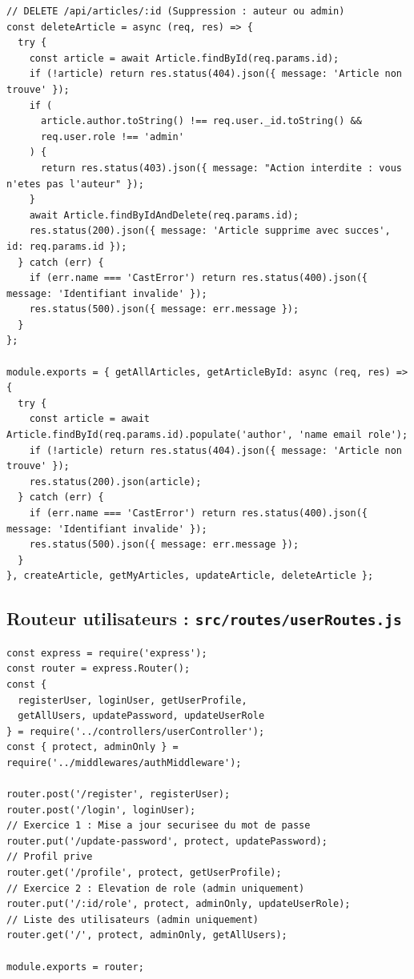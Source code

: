 \documentclass[12pt, a4paper]{article}
\begin{document}
\begin{lstlisting}
// DELETE /api/articles/:id (Suppression : auteur ou admin)
const deleteArticle = async (req, res) => {
  try {
    const article = await Article.findById(req.params.id);
    if (!article) return res.status(404).json({ message: 'Article non trouve' });
    if (
      article.author.toString() !== req.user._id.toString() &&
      req.user.role !== 'admin'
    ) {
      return res.status(403).json({ message: "Action interdite : vous n'etes pas l'auteur" });
    }
    await Article.findByIdAndDelete(req.params.id);
    res.status(200).json({ message: 'Article supprime avec succes', id: req.params.id });
  } catch (err) {
    if (err.name === 'CastError') return res.status(400).json({ message: 'Identifiant invalide' });
    res.status(500).json({ message: err.message });
  }
};

module.exports = { getAllArticles, getArticleById: async (req, res) => {
  try {
    const article = await Article.findById(req.params.id).populate('author', 'name email role');
    if (!article) return res.status(404).json({ message: 'Article non trouve' });
    res.status(200).json(article);
  } catch (err) {
    if (err.name === 'CastError') return res.status(400).json({ message: 'Identifiant invalide' });
    res.status(500).json({ message: err.message });
  }
}, createArticle, getMyArticles, updateArticle, deleteArticle };
\end{lstlisting}

\subsection{Routeur utilisateurs : \texttt{src/routes/userRoutes.js}}
\begin{lstlisting}
const express = require('express');
const router = express.Router();
const {
  registerUser, loginUser, getUserProfile,
  getAllUsers, updatePassword, updateUserRole
} = require('../controllers/userController');
const { protect, adminOnly } = require('../middlewares/authMiddleware');

router.post('/register', registerUser);
router.post('/login', loginUser);
// Exercice 1 : Mise a jour securisee du mot de passe
router.put('/update-password', protect, updatePassword);
// Profil prive
router.get('/profile', protect, getUserProfile);
// Exercice 2 : Elevation de role (admin uniquement)
router.put('/:id/role', protect, adminOnly, updateUserRole);
// Liste des utilisateurs (admin uniquement)
router.get('/', protect, adminOnly, getAllUsers);

module.exports = router;
\end{lstlisting}
\end{document}
